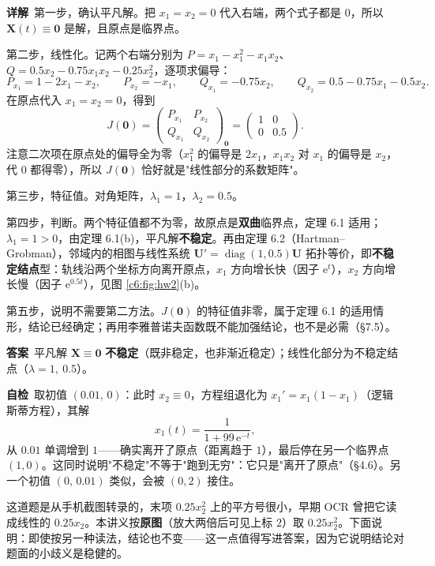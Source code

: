 \documentclass[11pt]{ctexart}
\newcommand{\X}{\mathbf{X}}\newcommand{\Y}{\mathbf{Y}}
\newcommand{\U}{\mathbf{U}}
\newcommand{\Jac}{J}
\begin{document}
\textbf{详解}\
第一步，确认平凡解。把 $x_1=x_2=0$ 代入右端，两个式子都是 $0$，所以 $\X(t)\equiv\mathbf{0}$ 是解，且原点是临界点。

第二步，线性化。记两个右端分别为 $P=x_1-x_1^{2}-x_1x_2$、$Q=0.5x_2-0.75x_1x_2-0.25x_2^{2}$，逐项求偏导：
\[
P_{x_1}=1-2x_1-x_2,\qquad P_{x_2}=-x_1,\qquad
Q_{x_1}=-0.75x_2,\qquad Q_{x_2}=0.5-0.75x_1-0.5x_2 .
\]
在原点代入 $x_1=x_2=0$，得到
\[
\Jac(\mathbf{0})=\begin{pmatrix}P_{x_1}&P_{x_2}\\Q_{x_1}&Q_{x_2}\end{pmatrix}_{\mathbf{0}}
=\begin{pmatrix}1&0\\0&0.5\end{pmatrix}.
\]
注意二次项在原点处的偏导全为零（$x_1^{2}$ 的偏导是 $2x_1$，$x_1x_2$ 对 $x_1$ 的偏导是 $x_2$，代 $0$ 都得零），所以 $\Jac(\mathbf{0})$ 恰好就是"线性部分的系数矩阵"。

第三步，特征值。对角矩阵，$\lambda_1=1$，$\lambda_2=0.5$。

第四步，判断。两个特征值都不为零，故原点是\textbf{双曲}临界点，定理 6.1 适用；$\lambda_1=1>0$，由定理 6.1(b)，平凡解\textbf{不稳定}。再由定理 6.2（Hartman--Grobman），邻域内的相图与线性系统 $\U'=\operatorname{diag}(1,0.5)\U$ 拓扑等价，即\textbf{不稳定结点}型：轨线沿两个坐标方向离开原点，$x_1$ 方向增长快（因子 $\mathrm{e}^{t}$），$x_2$ 方向增长慢（因子 $\mathrm{e}^{0.5t}$），见图 \ref{c6:fig:hw2}(b)。

第五步，说明不需要第二方法。$\Jac(\mathbf{0})$ 的特征值非零，属于定理 6.1 的适用情形，结论已经确定；再用李雅普诺夫函数既不能加强结论，也不是必需（§7.5）。

\textbf{答案}\ 平凡解 $\X\equiv\mathbf{0}$ \textbf{不稳定}（既非稳定，也非渐近稳定）；线性化部分为不稳定结点（$\lambda=1,\ 0.5$）。

\textbf{自检}\ 取初值 $(0.01,\,0)$：此时 $x_2\equiv0$，方程组退化为 $x_1'=x_1(1-x_1)$（逻辑斯蒂方程），其解
\[
x_1(t)=\frac{1}{1+99\,\mathrm{e}^{-t}},
\]
从 $0.01$ 单调增到 $1$——确实离开了原点（距离趋于 $1$），最后停在另一个临界点 $(1,0)$。这同时说明"不稳定"不等于"跑到无穷"：它只是"离开了原点"（§4.6）。另一个初值 $(0,\,0.01)$ 类似，会被 $(0,2)$ 接住。

\newpage


这道题是从手机截图转录的，末项 $0.25x_2^{2}$ 上的平方号很小，早期 OCR 曾把它读成线性的 $0.25x_2$。本讲义按\textbf{原图}（放大两倍后可见上标 $2$）取 $0.25x_2^{2}$。下面说明：即使按另一种读法，结论也不变——这一点值得写进答案，因为它说明结论对题面的小歧义是稳健的。
\end{document}
